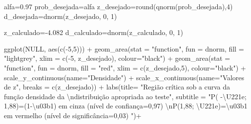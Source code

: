 \documentclass[
]{book}
\newenvironment{Shaded}{\begin{snugshade}}{\end{snugshade}}
\newcommand{\AttributeTok}[1]{\textcolor[rgb]{0.77,0.63,0.00}{#1}}
\newcommand{\ConstantTok}[1]{\textcolor[rgb]{0.00,0.00,0.00}{#1}}
\newcommand{\DecValTok}[1]{\textcolor[rgb]{0.00,0.00,0.81}{#1}}
\newcommand{\FloatTok}[1]{\textcolor[rgb]{0.00,0.00,0.81}{#1}}
\newcommand{\FunctionTok}[1]{\textcolor[rgb]{0.00,0.00,0.00}{#1}}
\newcommand{\NormalTok}[1]{#1}
\newcommand{\OtherTok}[1]{\textcolor[rgb]{0.56,0.35,0.01}{#1}}
\newcommand{\SpecialCharTok}[1]{\textcolor[rgb]{0.00,0.00,0.00}{#1}}
\newcommand{\StringTok}[1]{\textcolor[rgb]{0.31,0.60,0.02}{#1}}
\begin{document}
\begin{Shaded}
\begin{Highlighting}[]
\NormalTok{alfa}\OtherTok{=}\FloatTok{0.97}
\NormalTok{prob\_desejada}\OtherTok{=}\NormalTok{alfa}
\NormalTok{z\_desejado}\OtherTok{=}\FunctionTok{round}\NormalTok{(}\FunctionTok{qnorm}\NormalTok{(prob\_desejada),}\DecValTok{4}\NormalTok{)}
\NormalTok{d\_desejada}\OtherTok{=}\FunctionTok{dnorm}\NormalTok{(z\_desejado, }\DecValTok{0}\NormalTok{, }\DecValTok{1}\NormalTok{)}

\NormalTok{z\_calculado}\OtherTok{=}\SpecialCharTok{{-}}\FloatTok{4.082}
\NormalTok{d\_calculado}\OtherTok{=}\FunctionTok{dnorm}\NormalTok{(z\_calculado, }\DecValTok{0}\NormalTok{, }\DecValTok{1}\NormalTok{)}




\FunctionTok{ggplot}\NormalTok{(}\ConstantTok{NULL}\NormalTok{, }\FunctionTok{aes}\NormalTok{(}\FunctionTok{c}\NormalTok{(}\SpecialCharTok{{-}}\DecValTok{5}\NormalTok{,}\DecValTok{5}\NormalTok{))) }\SpecialCharTok{+}
  \FunctionTok{geom\_area}\NormalTok{(}\AttributeTok{stat =} \StringTok{"function"}\NormalTok{, }
            \AttributeTok{fun =}\NormalTok{ dnorm, }
            \AttributeTok{fill =} \StringTok{"lightgrey"}\NormalTok{, }
            \AttributeTok{xlim =} \FunctionTok{c}\NormalTok{(}\SpecialCharTok{{-}}\DecValTok{5}\NormalTok{, z\_desejado),}
            \AttributeTok{colour=}\StringTok{"black"}\NormalTok{) }\SpecialCharTok{+}
  \FunctionTok{geom\_area}\NormalTok{(}\AttributeTok{stat =} \StringTok{"function"}\NormalTok{, }
            \AttributeTok{fun =}\NormalTok{ dnorm, }
            \AttributeTok{fill =} \StringTok{"red"}\NormalTok{, }
            \AttributeTok{xlim =} \FunctionTok{c}\NormalTok{(z\_desejado,}\DecValTok{5}\NormalTok{),}
            \AttributeTok{colour=}\StringTok{"black"}\NormalTok{) }\SpecialCharTok{+}
  \FunctionTok{scale\_y\_continuous}\NormalTok{(}\AttributeTok{name=}\StringTok{"Densidade"}\NormalTok{) }\SpecialCharTok{+}
  \FunctionTok{scale\_x\_continuous}\NormalTok{(}\AttributeTok{name=}\StringTok{"Valores de z"}\NormalTok{, }\AttributeTok{breaks =} \FunctionTok{c}\NormalTok{(z\_desejado))  }\SpecialCharTok{+}
  \FunctionTok{labs}\NormalTok{(}\AttributeTok{title=} 
         \StringTok{"Região crítica sob a curva da função densidade da }\SpecialCharTok{\textbackslash{}n}\StringTok{distribuição apropriada ao teste"}\NormalTok{, }
       \AttributeTok{subtitle =} \StringTok{"P( {-}\textbackslash{}U221e; 1,88)=(1{-}\textbackslash{}u03b1) em cinza (nível de confiança=0,97) }\SpecialCharTok{\textbackslash{}n}\StringTok{P(1,88; \textbackslash{}U221e)=\textbackslash{}u03b1 em vermelho (nível de significância=0,03) "}\NormalTok{)}\SpecialCharTok{+}

\end{Highlighting}
\end{Shaded}
\end{document}
